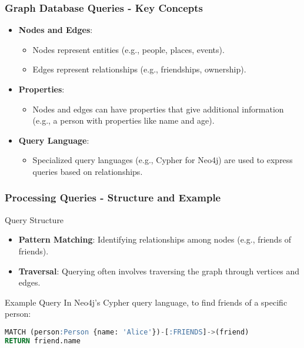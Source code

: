 \documentclass[aspectratio=169]{beamer}
\begin{document}
\begin{frame}[fragile]
    \frametitle{Graph Database Queries - Key Concepts}
    \begin{itemize}
        \item \textbf{Nodes and Edges}:
        \begin{itemize}
            \item Nodes represent entities (e.g., people, places, events).
            \item Edges represent relationships (e.g., friendships, ownership).
        \end{itemize}
        \item \textbf{Properties}:
        \begin{itemize}
            \item Nodes and edges can have properties that give additional information (e.g., a person with properties like name and age).
        \end{itemize}
        \item \textbf{Query Language}:
        \begin{itemize}
            \item Specialized query languages (e.g., Cypher for Neo4j) are used to express queries based on relationships.
        \end{itemize}
    \end{itemize}
\end{frame}

\begin{frame}[fragile]
    \frametitle{Processing Queries - Structure and Example}
    \begin{block}{Query Structure}
        \begin{itemize}
            \item \textbf{Pattern Matching}: Identifying relationships among nodes (e.g., friends of friends).
            \item \textbf{Traversal}: Querying often involves traversing the graph through vertices and edges.
        \end{itemize}
    \end{block}
    \begin{block}{Example Query}
        In Neo4j’s Cypher query language, to find friends of a specific person:
        \begin{lstlisting}[language=SQL]
MATCH (person:Person {name: 'Alice'})-[:FRIENDS]->(friend)
RETURN friend.name
        \end{lstlisting}
    \end{block}
\end{frame}
\end{document}
